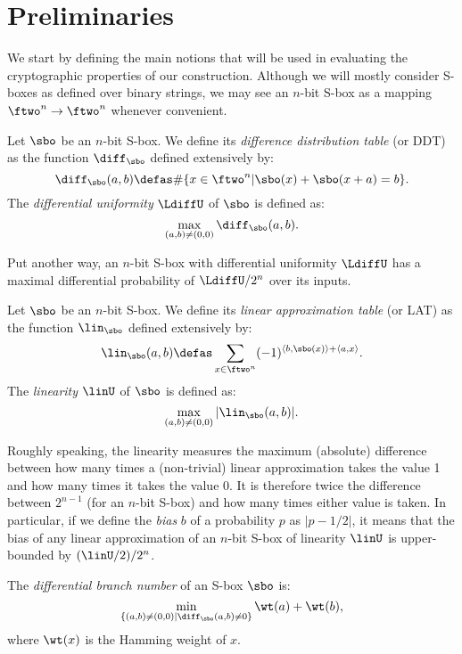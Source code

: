 \section{Preliminaries}

We start by defining the main notions that will be used in evaluating the cryptographic properties of our construction.
Although we will mostly consider S-boxes as defined over binary strings, we may see an $n$-bit S-box as a mapping
$\ftwo^n \rightarrow \ftwo^n$ whenever convenient.


\begin{defi}
Let $\sbo$ be an $n$-bit S-box. We define its
\emph{difference distribution table} (or DDT) as the function $\diff_{\sbo}$ defined extensively by:
\[
\diff_{\sbo}(a,b) \defas \#\{x \in \ftwo^n | \sbo(x) + \sbo(x + a) = b\}.
\]
The \emph{differential uniformity} $\LdiffU$ of $\sbo$ is defined as:
\[
\max_{(a,b) \neq (0,0)} \diff_{\sbo}(a,b).
\]
\end{defi}
Put another way, an $n$-bit S-box with differential uniformity $\LdiffU$ has a maximal differential probability
of $\LdiffU/2^n$ over its inputs.


\begin{defi}
Let $\sbo$ be an $n$-bit S-box. We define its
\emph{linear approximation table} (or LAT) as the function $\lin_{\sbo}$ defined extensively by:
\[
\lin_{\sbo}(a,b) \defas \sum_{x \in \ftwo^n} (-1)^{\langle b,\sbo(x)\rangle + \langle a, x\rangle}.
\]
The \emph{linearity} $\linU$ of $\sbo$ is defined as:
\[
\max_{(a,b) \neq (0,0)} |\lin_{\sbo}(a,b)|.
\]
\end{defi}
Roughly speaking, the linearity measures the maximum (absolute) difference between how many times a (non-trivial) linear approximation
takes the value 1 and how many times it takes the value 0. It is therefore twice the difference between $2^{n-1}$ (for an $n$-bit S-box)
and how many times either value is taken.
In particular, if we define the \emph{bias} $b$ of a probability $p$ as $|p - 1/2|$, it means that
the bias of any linear approximation of an $n$-bit S-box of linearity $\linU$ is upper-bounded by $(\linU/2)/2^n$.

\begin{defi}
The \emph{differential branch number} of an S-box $\sbo$ is:
\[
\min_{\{(a,b) \neq (0,0) | \diff_{\sbo}(a,b) \neq 0\}} \wt(a) + \wt(b),
\]
where $\wt(x)$ is the Hamming weight of $x$. 
\end{defi}

